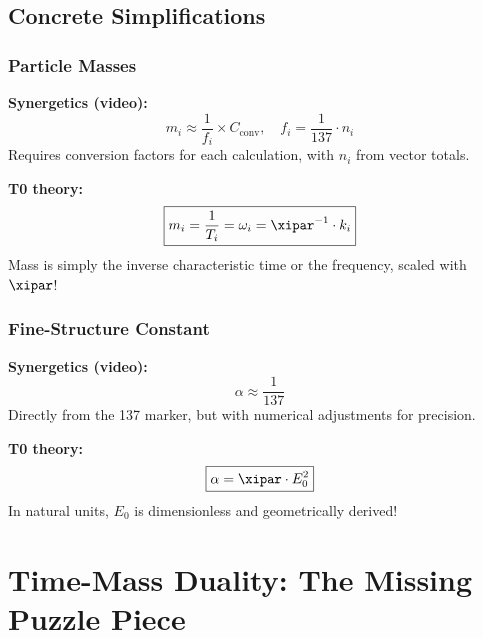 	\subsection{Concrete Simplifications}
	
	\subsubsection{Particle Masses}
	
	\textbf{Synergetics (video):}
	\begin{equation}
		m_i \approx \frac{1}{f_i} \times C_{\text{conv}}, \quad f_i = \frac{1}{137} \cdot n_i
	\end{equation}
	Requires conversion factors for each calculation, with $n_i$ from vector totals.
	
	\textbf{T0 theory:}
	\begin{equation}
		\boxed{m_i = \frac{1}{T_i} = \omega_i = \xipar^{-1} \cdot k_i}
	\end{equation}
	Mass is simply the inverse characteristic time or the frequency, scaled with $\xipar$!
	
	\subsubsection{Fine-Structure Constant}
	
	\textbf{Synergetics (video):}
	\begin{equation}
		\alpha \approx \frac{1}{137}
	\end{equation}
	Directly from the 137 marker, but with numerical adjustments for precision.
	
	\textbf{T0 theory:}
	\begin{equation}
		\boxed{\alpha = \xipar \cdot E_0^2}
	\end{equation}
	In natural units, $E_0$ is dimensionless and geometrically derived!
	
	\section{Time-Mass Duality: The Missing Puzzle Piece}
	
